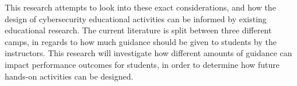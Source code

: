 This research attempts to look into these exact considerations, and how the design of cybersecurity educational activities can be informed by existing educational research. The current literature is split between three different camps, in regards to how much guidance should be given to students by the instructors. This research will investigate how different amounts of guidance can impact performance outcomes for students, in order to determine how future hands-on activities can be designed. 
    